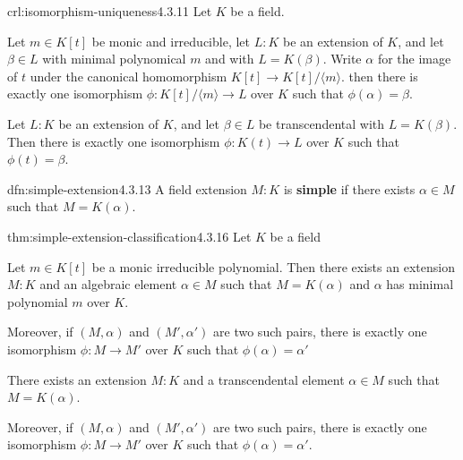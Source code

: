 \documentclass[landscape, 8pt]{extarticle}
\begin{document}
\begin{multicols}{3}
\begin{crl}{crl:isomorphism-uniqueness}{4.3.11}
    Let $K$ be a field.
    \begin{enumerate-tight}
        \item Let $m\in K[t]$ be monic and irreducible, let $L : K$ be an extension of $K$, and let $\beta\in L$ with minimal polynomical $m$ and with $L = K(\beta)$. Write $\alpha$ for the image of $t$ under the canonical homomorphism $K[t] \to K[t] / \langle m \rangle$. then there is exactly one isomorphism $\phi : K[t] / \langle m \rangle \to L$ over $K $ such that $\phi(\alpha) = \beta$.
        \item Let $L : K$ be an extension of $K$, and let $\beta \in L$ be transcendental with $L = K(\beta)$. Then there is exactly one isomorphism $\phi : K(t) \to L$ over $K$ such that $\phi(t) = \beta$.
    \end{enumerate-tight}
\end{crl}

\begin{dfn}{dfn:simple-extension}{4.3.13}
    A field extension $M : K$ is \textbf{simple} if there exists $\alpha \in M$ such that $M = K(\alpha)$.
\end{dfn}

\begin{thm}{thm:simple-extension-classification}{4.3.16}
    Let $K$ be a field
    \begin{enumerate-tight}
        \item Let $m\in K[t]$ be a monic irreducible polynomial. Then there exists an extension $M : K$ and an algebraic element $\alpha\in M$ such that $M = K(\alpha)$ and $\alpha$ has minimal polynomial $m$ over $K$. 

            Moreover, if $(M, \alpha)$ and $(M',\alpha')$ are two such pairs, there is exactly one isomorphism $\phi : M \to M'$ over $K$ such that $\phi(\alpha) = \alpha'$
        \item There exists an extension $M : K$ and a transcendental element $\alpha \in M$ such that $M = K(\alpha)$.

            Moreover, if $(M, \alpha)$ and $(M',\alpha')$ are two such pairs, there is exactly one isomorphism $\phi : M \to M'$ over $K$ such that $\phi(\alpha) = \alpha'$.
    \end{enumerate-tight}
\end{thm}


\lipsum[1-6]
\end{multicols}
\end{document}
